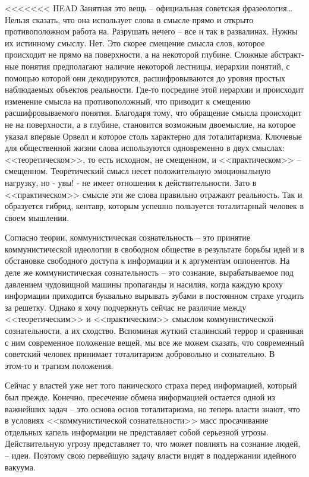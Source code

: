 \documentclass{book}
\begin{document}
<<<<<<< HEAD
Занятная это вещь -- официальная советская фразеология\ldots Нельзя сказать, что она использует слова в смысле прямо и открыто противоположном работа на.  Разрушать нечего -- все и так в развалинах. Нужны их истинному смыслу. Нет. Это скорее смещение смысла слов, которое происходит не прямо на поверхности, а на некоторой глубине. Сложные абстракт­ные понятия предполагают наличие некоторой лестницы, ие­рархии понятий, с помощью которой они декодируются, рас­шифровываются до уровня простых наблюдаемых объектов реальности. Где‑то посредине этой иерархии и происходит изме­нение смысла на противоположный, что приводит к смещению расшифровываемого понятия. Благодаря тому, что обращение смысла происходит не на поверхности, а в глубине, становит­ся возможным двоемыслие,  на которое указал впервые Орвелл и которое столь характерно для тоталитаризма. Ключе­вые для общественной жизни слова используются одновре­менно в двух смыслах: <<теоретическом>>, то есть исходном, не смещенном, и <<практическом>> -- смещенном. Теоретиче­ский смысл несет положительную эмоциональную нагрузку, но ‑ увы! ‑ не имеет отношения к действительности. Зато в <<практическом>> смысле эти же слова правильно отражают реальность. Так и образуется гибрид, кентавр, которым успеш­но пользуется тоталитарный человек в своем мышлении.

Согласно теории, коммунистическая сознательность -- это принятие коммунистической идеологии в свободном обществе в результате борьбы идей и в обстановке свободного доступа к информации и к аргументам оппонентов. На деле же коммунистическая сознательность -- это сознание, вырабатываемое под давлением чудовищной машины пропаганды и насилия, когда каждую кроху информации приходится буквально вырывать зубами в постоянном страхе угодить за решетку. Однако я хочу подчеркнуть сейчас не различие между <<теоретическим>> и <<практическим>> смыслом коммунистической сознательности, а их сходство. Вспоминая жуткий сталинский террор и сравни­вая с ним современное положение вещей, мы все же можем сказать, что современный советский человек принимает тоталитаризм добровольно и сознательно. В этом‑то и трагизм положения.

Сейчас у властей уже нет того панического страха перед информацией, который был прежде. Конечно, пресечение обме­на информацией остается одной из важнейших задач -- это основа основ тоталитаризма, но теперь власти знают, что в условиях <<коммунистической сознательности>> масс просачивание отдельных капель информации не представляет собой серьезной угрозы. Действительную угрозу представляет то, что может повлиять на сознание людей, -- идеи. Поэтому свою первейшую задачу власти видят в поддержании идейного вакуума.
\end{document}

